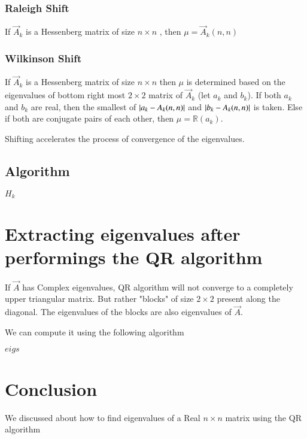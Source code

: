 \documentclass[journal]{IEEEtran}
\numberwithin{equation}{section}
\begin{document}
\subsubsection{Raleigh Shift} If $\vec{A}_k$ is a Hessenberg matrix of size $n \times n$ , then $\mu = \vec{A}_k(n,n)$
\subsubsection{Wilkinson Shift} If $\vec{A}_k$ is a Hessenberg matrix of size $n \times n$ then $\mu$ is determined based on the eigenvalues of bottom right most $2\times 2$ matrix of $\vec{A}_k$ (let $a_k$ and $b_k$). If both $a_k$ and $b_k$ are real, then the smallest of $\left\vert a_k - A_k(n,n)\right\vert$ and $\left\vert b_k - A_k(n,n)\right\vert$ is taken. Else if both are conjugate pairs of each other, then $\mu = \mathbb{R}(a_k)$.

Shifting accelerates the process of convergence of the eigenvalues.

\subsection{Algorithm}

\begin{algorithmic}
    \EndFor
    \Return $H_k$
\end{algorithmic}

\section{Extracting eigenvalues after performings the QR algorithm}
If $\vec{A}$ has Complex eigenvalues, QR algorithm will not converge to a completely upper triangular matrix. But rather "blocks" of size $2 \times 2$ present along the diagonal. The eigenvalues of the blocks are also eigenvalues of $\vec{A}$.

We can compute it using the following algorithm

\begin{algorithmic}
        \Else
        \EndIf
    \EndWhile
    \Return $eigs$
\end{algorithmic}

\section{Conclusion}
We discussed about how to find eigenvalues of a Real $n \times n$ matrix using the QR algorithm
\end{document}
